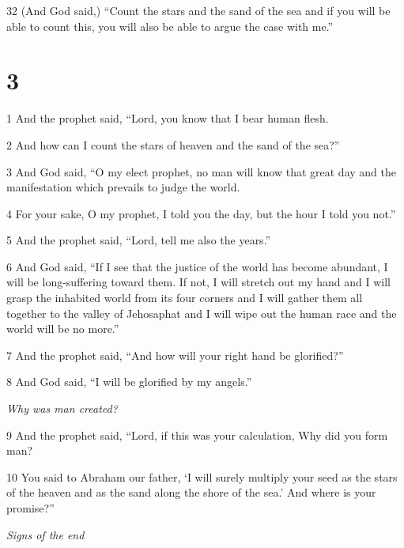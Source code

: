 \par 32 (And God said,) “Count the stars and the sand of the sea and if you will be able to count this, you will also be able to argue the case with me.”

\chapter{3}

\par 1 And the prophet said, “Lord, you know that I bear human flesh. 

\par 2 And how can I count the stars of heaven and the sand of the sea?”

\par 3 And God said, “O my elect prophet, no man will know that great day and the manifestation which prevails to judge the world.

\par 4 For your sake, O my prophet, I told you the day, but the hour I told you not.”

\par 5 And the prophet said, “Lord, tell me also the years.” 

\par 6 And God said, “If I see that the justice of the world has become abundant, I will be long-suffering toward them. If not, I will stretch out my hand and I will grasp the inhabited world from its four corners and I will gather them all together to the valley of Jehosaphat and I will wipe out the human race and the world will be no more.”

\par 7 And the prophet said, “And how will your right hand be glorified?”

\par 8 And God said, “I will be glorified by my angels.”

\par \textit{Why was man created?}

\par 9 And the prophet said, “Lord, if this was your calculation, Why did you form man?

\par 10 You said to Abraham our father, ‘I will surely multiply your seed as the stars of the heaven and as the sand along the shore of the sea.’ And where is your promise?”

\par \textit{Signs of the end}

